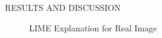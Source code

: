 \begin{section}[]{\uppercase{Results and Discussion}}
\begin{figure}[H]
\begin{minipage}{0.45\textwidth}
        \captionsetup{font=small}
        \caption{LIME Explanation for Real Image}
        \label{fig:lime-real}
    \end{minipage}
\end{figure}



\end{section}

\pagebreak
